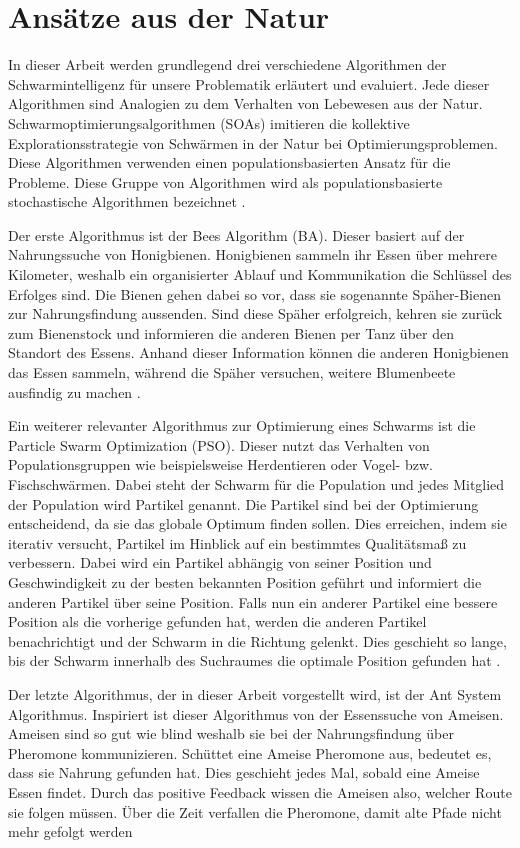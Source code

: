 \section{Ansätze aus der Natur}
In dieser Arbeit werden grundlegend drei verschiedene Algorithmen der Schwarmintelligenz für unsere Problematik  erläutert und evaluiert. Jede dieser Algorithmen sind Analogien zu dem Verhalten von Lebewesen aus der Natur. Schwarmoptimierungsalgorithmen (SOAs) imitieren die kollektive Explorationsstrategie von Schwärmen in der Natur bei Optimierungsproblemen. Diese Algorithmen verwenden einen populationsbasierten Ansatz für die Probleme. Diese Gruppe von Algorithmen wird als populationsbasierte stochastische Algorithmen bezeichnet \cite{Yuce2013}.

Der erste Algorithmus ist der Bees Algorithm (BA). Dieser basiert auf der Nahrungssuche von Honigbienen. Honigbienen sammeln ihr Essen über mehrere Kilometer, weshalb ein organisierter Ablauf und Kommunikation die Schlüssel des Erfolges sind. Die Bienen gehen dabei so vor, dass sie sogenannte Späher-Bienen zur Nahrungsfindung aussenden. Sind diese Späher erfolgreich, kehren sie zurück zum Bienenstock und informieren die anderen Bienen per Tanz über den Standort des Essens. Anhand dieser Information können die anderen Honigbienen das Essen sammeln, während die Späher versuchen, weitere Blumenbeete ausfindig zu machen \cite{Brownlee2011}.

Ein weiterer relevanter Algorithmus zur Optimierung eines Schwarms ist die Particle Swarm Optimization (PSO). Dieser nutzt das Verhalten von Populationsgruppen wie beispielsweise Herdentieren oder  Vogel- bzw. Fischschwärmen. Dabei steht der Schwarm für die Population und jedes Mitglied der Population wird Partikel genannt. Die Partikel sind bei der Optimierung entscheidend, da sie das globale Optimum finden sollen. Dies erreichen, indem sie iterativ versucht, Partikel im Hinblick auf ein bestimmtes Qualitätsmaß zu verbessern. Dabei wird ein Partikel abhängig von seiner Position und Geschwindigkeit zu der besten bekannten Position geführt und informiert die anderen Partikel über seine Position. Falls nun ein anderer Partikel eine bessere Position als die vorherige gefunden hat, werden die anderen Partikel benachrichtigt und der Schwarm in die Richtung gelenkt. Dies geschieht so lange, bis der Schwarm innerhalb des Suchraumes die optimale Position gefunden hat \cite{Brownlee2011}. 

Der letzte Algorithmus, der in dieser Arbeit vorgestellt wird, ist der Ant System Algorithmus. Inspiriert ist dieser Algorithmus von der Essenssuche von Ameisen. Ameisen sind so gut wie blind weshalb sie bei der Nahrungsfindung über Pheromone kommunizieren. Schüttet eine Ameise Pheromone aus, bedeutet es, dass sie Nahrung gefunden hat. Dies geschieht jedes Mal, sobald eine Ameise Essen findet. Durch das positive Feedback wissen die Ameisen also, welcher Route sie folgen müssen. Über die Zeit verfallen die Pheromone, damit alte Pfade nicht mehr gefolgt werden \cite{Brownlee2011}

